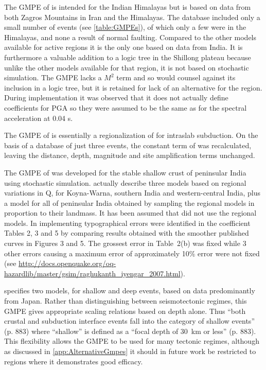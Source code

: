 \documentclass{article}
\begin{document}
The GMPE of \cite{sharma2009ground} is intended for the Indian Himalayas but is based on data from both Zagros Mountains in Iran and the Himalayas.
The database included only a small number of events (see \autoref{table:GMPEs}), of which only a few were in the Himalayas, and none a result of normal faulting. 
Compared to the other models available for active regions it is the only one based on data from India.
It is furthermore a valuable addition to a logic tree in the Shillong plateau because unlike the other models available for that region, it is not based on stochastic simulation. The GMPE lacks a $M^2$ term and so \cite{cotton2006criteria} would counsel against its inclusion in a logic tree, but it is retained for lack of an alternative for the region. 
During implementation it was observed that it does not actually define coefficients for PGA so they were assumed to be the same as for the spectral acceleration at 0.04 s.

The GMPE of \cite{gupta2010response} is essentially a regionalization of \cite{atkinson2003empirical} for intraslab subduction. 
On the basis of a database of just three events, the constant term of \cite{atkinson2003empirical} was recalculated, leaving the distance, depth, magnitude and site amplification terms unchanged.

The GMPE of \cite{raghukanth2007estimation} was developed for the stable shallow crust of peninsular India using stochastic simulation.  
\cite{raghukanth2007estimation} actually describe three models based on regional variations in Q, for Koyna-Warna, southern India and western-central India, plus a model for all of peninsular India obtained by sampling the regional models in proportion to their landmass. 
It has been assumed that \cite{nath2012probabilistic} did not use the regional models. 
In implementing \cite{raghukanth2007estimation} typographical errors were identified in the coefficient Tables 2, 3 and 5 by comparing results obtained with the smoother published curves in Figures 3 and 5. 
The grossest error in Table~2(b) was fixed while 3 other errors causing a maximum error of approximately 10\% error were not fixed (see \url{ http://docs.openquake.org/oq-hazardlib/master/gsim/raghukanth_iyengar_2007.html}).

\cite{kanno2006new} specifies two models, for shallow and deep events, based on data predominantly from Japan. 
Rather than distinguishing between seismotectonic regimes, this GMPE gives appropriate scaling relations based on depth alone. 
Thus ``both crustal and subduction interface events fall into the category of shallow events'' (p. 883) where ``shallow'' is defined as a ``focal depth of 30~km or less'' (p. 883).
This flexibility allows the GMPE to be used for many tectonic regimes, although as discussed in \autoref{app:AlternativeGmpes} it should in future work be restricted to regions where it demonstrates good efficacy. 
\end{document}
